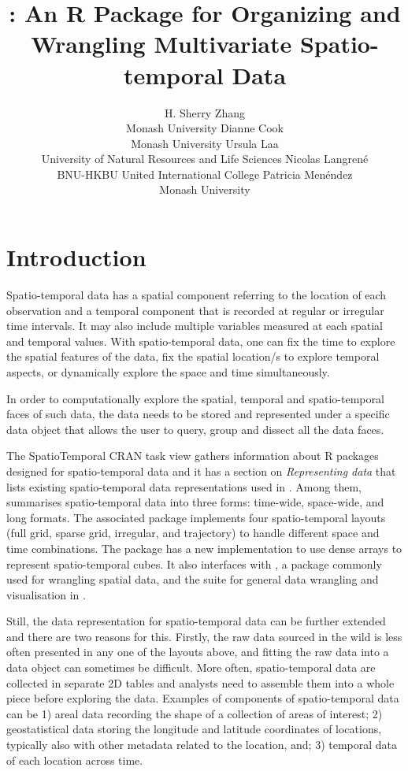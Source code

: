 \documentclass[
]{jss}
\author{
H. Sherry Zhang\\Monash University \And Dianne Cook\\Monash University \AND Ursula Laa\\University of Natural Resources and Life Sciences \AND Nicolas Langrené\\BNU-HKBU United International College \And Patricia Menéndez\\Monash University
}
\title{\pkg{cubble}: An R Package for Organizing and Wrangling Multivariate Spatio-temporal Data}
\begin{document}
\newpage

\hypertarget{introduction}{%
\section{Introduction}\label{introduction}}

Spatio-temporal data has a spatial component referring to the location of each observation and a temporal component that is recorded at regular or irregular time intervals. It may also include multiple variables measured at each spatial and temporal values. With spatio-temporal data, one can fix the time to explore the spatial features of the data, fix the spatial location/s to explore temporal aspects, or dynamically explore the space and time simultaneously.

In order to computationally explore the spatial, temporal and spatio-temporal faces of such data, the data needs to be stored and represented under a specific data object that allows the user to query, group and dissect all the data faces.

The SpatioTemporal CRAN task view \citep{ctvspatiotemporal} gathers information about R packages designed for spatio-temporal data and it has a section on \emph{Representing data} that lists existing spatio-temporal data representations used in . Among them, \citet{spacetime} summarises spatio-temporal data into three forms: time-wide, space-wide, and long formats. The associated package  \citep{spacetime} implements four spatio-temporal layouts (full grid, sparse grid, irregular, and trajectory) to handle different space and time combinations. The  \citep{stars} package has a new implementation to use dense arrays to represent spatio-temporal cubes. It also interfaces with  \citep{sf}, a package commonly used for wrangling spatial data, and the  \citep{tidyverse} suite for general data wrangling and visualisation in .

Still, the data representation for spatio-temporal data can be further extended and there are two reasons for this. Firstly, the raw data sourced in the wild is less often presented in any one of the layouts above, and fitting the raw data into a data object can sometimes be difficult. More often, spatio-temporal data are collected in separate 2D tables and analysts need to assemble them into a whole piece before exploring the data. Examples of components of spatio-temporal data can be 1) areal data recording the shape of a collection of areas of interest; 2) geostatistical data storing the longitude and latitude coordinates of locations, typically also with other metadata related to the location, and; 3) temporal data of each location across time.
\end{document}
